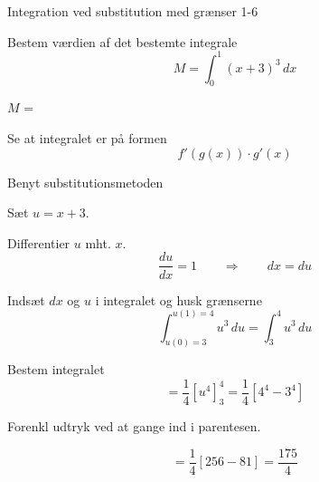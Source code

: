 \documentclass{article}
\begin{document}
\begin{exercise}{Integration ved substitution med grænser 1-6}


Bestem værdien af det bestemte integrale
\[
M = \int_0^1 (x + 3)^3 \, dx
\]

$M$ = 



\hint

Se at integralet er på formen
\[
f'(g(x)) \cdot g'(x)
\]

\hint

Benyt substitutionsmetoden

\hint

Sæt $u=x + 3$.


\hint

Differentier $u$ mht. $x$.
\[
\frac{du}{dx} = 1 \qquad\Rightarrow \qquad dx = du
\]

\hint

Indsæt $dx$ og $u$ i integralet og husk grænserne
\[
\int_{u(0)=3}^{u(1)=4} u^3 \, du = \int_{3}^{4} u^3 \, du
\]

\hint

Bestem integralet
\[
= \frac{1}{4} \left[ u^4 \right] _3^4 = \frac{1}{4} \left[ 4^4 - 3^4 \right]
\]

\hint
Forenkl udtryk ved at gange ind i parentesen.

\hint

\[
= \frac{1}{4} \left[ 256 - 81 \right] = \frac{175}{4}
\]


\end{exercise}

\newpage
\end{document}
